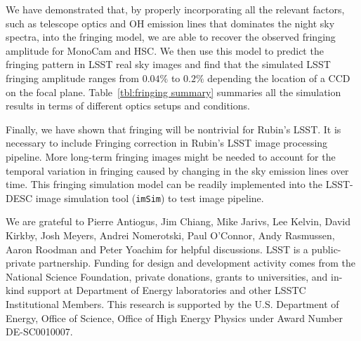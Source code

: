 \documentclass[twocolumn]{aastex63} %
\begin{document}
\begin{CJK*}{UTF8}{gbsn}
We have demonstrated that, by properly incorporating all the relevant factors, such as telescope optics and OH emission lines that dominates the night sky spectra, into the fringing model, we are able to recover the observed fringing amplitude for MonoCam and HSC. We then use this model to predict the fringing pattern in LSST real sky images and find that the simulated LSST fringing amplitude ranges from $0.04\%$  to $0.2\%$ depending the location of a CCD on the focal plane. Table~\ref{tbl:fringing summary} summaries all the simulation results in terms of different optics setups and conditions. 

Finally, we have shown that fringing will be nontrivial for Rubin's LSST. It is necessary to include Fringing correction in Rubin's LSST image processing pipeline. More long-term fringing images might be needed to account for the temporal variation in fringing caused by changing in the sky emission lines over time. This fringing simulation model can be readily implemented into the LSST-DESC image simulation tool (\verb|imSim|) to test image pipeline. 




\acknowledgements
We are grateful to Pierre Antiogus, Jim Chiang, Mike Jarivs, Lee Kelvin, David Kirkby, Josh Meyers, Andrei Nomerotski, Paul O'Connor, Andy Rasmussen, Aaron Roodman and Peter Yoachim for helpful discussions.
LSST is a public-private partnership. Funding for design and development activity comes from the National Science Foundation, private donations, grants to universities, and in-kind support at Department of Energy laboratories and other LSSTC Institutional Members. This research is supported by the U.S. Department of Energy, Office  of  Science,  Office  of  High  Energy  Physics  under Award Number DE-SC0010007.


{}





\end{CJK*}
\end{document}
